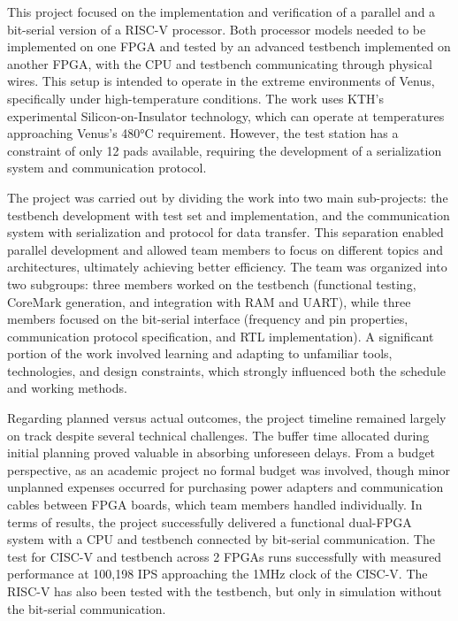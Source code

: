 \documentclass[10pt]{article}
\begin{document}
This project focused on the implementation and verification of a parallel and a bit-serial version of a RISC-V processor. Both processor models needed to be implemented on one FPGA and tested by an advanced testbench implemented on another FPGA, with the CPU and testbench communicating through physical wires. This setup is intended to operate in the extreme environments of Venus, specifically under high-temperature conditions. The work uses KTH's experimental Silicon-on-Insulator technology, which can operate at temperatures approaching Venus's 480°C requirement. However, the test station has a constraint of only 12 pads available, requiring the development of a serialization system and communication protocol.

The project was carried out by dividing the work into two main sub-projects: the testbench development with test set and implementation, and the communication system with serialization and protocol for data transfer. This separation enabled parallel development and allowed team members to focus on different topics and architectures, ultimately achieving better efficiency. The team was organized into two subgroups: three members worked on the testbench (functional testing, CoreMark generation, and integration with RAM and UART), while three members focused on the bit-serial interface (frequency and pin properties, communication protocol specification, and RTL implementation). A significant portion of the work involved learning and adapting to unfamiliar tools, technologies, and design constraints, which strongly influenced both the schedule and working methods.

Regarding planned versus actual outcomes, the project timeline remained largely on track despite several technical challenges. The buffer time allocated during initial planning proved valuable in absorbing unforeseen delays. From a budget perspective, as an academic project no formal budget was involved, though minor unplanned expenses occurred for purchasing power adapters and communication cables between FPGA boards, which team members handled individually. In terms of results, the project successfully delivered a functional dual-FPGA system with a CPU and testbench connected by bit-serial communication. The test for CISC-V and testbench across 2 FPGAs runs successfully with measured performance at 100,198 IPS approaching the 1MHz clock of the CISC-V. The RISC-V has also been tested with the testbench, but only in simulation without the bit-serial communication.
\end{document}
